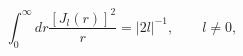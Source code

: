 \begin{equation}
\int_{0}^{\infty }dr\frac{\left[ J_{l}\left( r\right) \right] ^{2}}{r}%
=\left| 2l\right| ^{-1},\qquad l\neq 0,
\end{equation}

